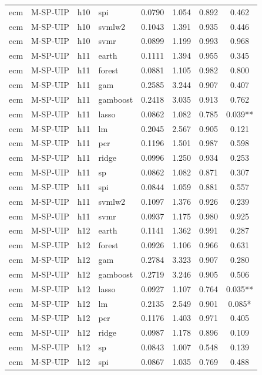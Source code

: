 \begin{ThreePartTable}
\begin{longtable}[t]{llclcccc}
ecm & M-SP-UIP & h10 & spi & 0.0790 & 1.054 & 0.892 & 0.462\\
ecm & M-SP-UIP & h10 & svmlw2 & 0.1043 & 1.391 & 0.935 & 0.446\\
ecm & M-SP-UIP & h10 & svmr & 0.0899 & 1.199 & 0.993 & 0.968\\
\addlinespace
ecm & M-SP-UIP & h11 & earth & 0.1111 & 1.394 & 0.955 & 0.345\\
ecm & M-SP-UIP & h11 & forest & 0.0881 & 1.105 & 0.982 & 0.800\\
ecm & M-SP-UIP & h11 & gam & 0.2585 & 3.244 & 0.907 & 0.407\\
ecm & M-SP-UIP & h11 & gamboost & 0.2418 & 3.035 & 0.913 & 0.762\\
ecm & M-SP-UIP & h11 & lasso & 0.0862 & 1.082 & 0.785 & 0.039**\\
ecm & M-SP-UIP & h11 & lm & 0.2045 & 2.567 & 0.905 & 0.121\\
ecm & M-SP-UIP & h11 & pcr & 0.1196 & 1.501 & 0.987 & 0.598\\
ecm & M-SP-UIP & h11 & ridge & 0.0996 & 1.250 & 0.934 & 0.253\\
ecm & M-SP-UIP & h11 & sp & 0.0862 & 1.082 & 0.871 & 0.307\\
ecm & M-SP-UIP & h11 & spi & 0.0844 & 1.059 & 0.881 & 0.557\\
ecm & M-SP-UIP & h11 & svmlw2 & 0.1097 & 1.376 & 0.926 & 0.239\\
ecm & M-SP-UIP & h11 & svmr & 0.0937 & 1.175 & 0.980 & 0.925\\
\addlinespace
ecm & M-SP-UIP & h12 & earth & 0.1141 & 1.362 & 0.991 & 0.287\\
ecm & M-SP-UIP & h12 & forest & 0.0926 & 1.106 & 0.966 & 0.631\\
ecm & M-SP-UIP & h12 & gam & 0.2784 & 3.323 & 0.907 & 0.280\\
ecm & M-SP-UIP & h12 & gamboost & 0.2719 & 3.246 & 0.905 & 0.506\\
ecm & M-SP-UIP & h12 & lasso & 0.0927 & 1.107 & 0.764 & 0.035**\\
ecm & M-SP-UIP & h12 & lm & 0.2135 & 2.549 & 0.901 & 0.085*\\
ecm & M-SP-UIP & h12 & pcr & 0.1176 & 1.403 & 0.971 & 0.405\\
ecm & M-SP-UIP & h12 & ridge & 0.0987 & 1.178 & 0.896 & 0.109\\
ecm & M-SP-UIP & h12 & sp & 0.0843 & 1.007 & 0.548 & 0.139\\
ecm & M-SP-UIP & h12 & spi & 0.0867 & 1.035 & 0.769 & 0.488\\

\end{longtable}
\end{ThreePartTable}
